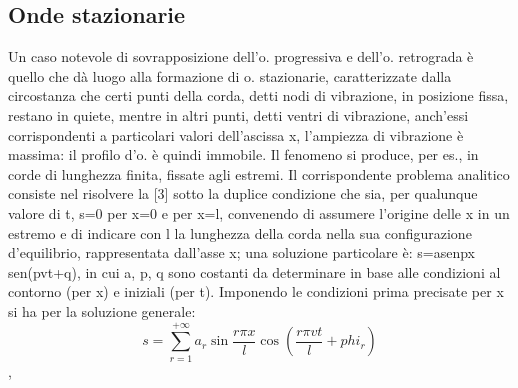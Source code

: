 \documentclass[a4paper]{article}
\begin{document}
\subsection{Onde stazionarie}
Un caso notevole di sovrapposizione dell'o. progressiva e dell'o. retrograda è quello che dà luogo alla formazione di o. stazionarie, caratterizzate dalla circostanza che certi punti della corda, detti nodi di vibrazione, in posizione fissa, restano in quiete, mentre in altri punti, detti ventri di vibrazione, anch'essi corrispondenti a particolari valori dell'ascissa x, l'ampiezza di vibrazione è massima: il profilo d'o. è quindi immobile. Il fenomeno si produce, per es., in corde di lunghezza finita, fissate agli estremi. Il corrispondente problema analitico consiste nel risolvere la [3] sotto la duplice condizione che sia, per qualunque valore di t, s=0 per x=0 e per x=l, convenendo di assumere l'origine delle x in un estremo e di indicare con l la lunghezza della corda nella sua configurazione d'equilibrio, rappresentata dall'asse x; una soluzione particolare è: s=asenpx sen(pvt+q), in cui a, p, q sono costanti da determinare in base alle condizioni al contorno (per x) e iniziali (per t). Imponendo le condizioni prima precisate per x si ha per la soluzione generale: 
\begin{equation}
s=\sum_{r=1}^{+\infty}a_r\sin\frac{r\pi x}{l}\cos(\frac{r\pi vt}{l}+phi_r)
\end{equation},
\end{document}
